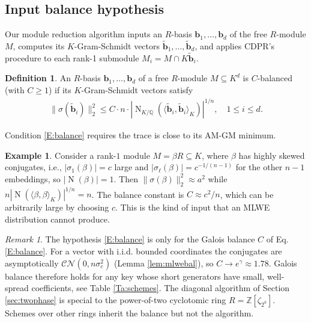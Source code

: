 \documentclass[11pt,a4paper]{article}
\theoremstyle{plain}
\theoremstyle{definition}
\newtheorem{definition}[theorem]{Definition}
\newtheorem{example}[theorem]{Example}
\theoremstyle{remark}
\newtheorem{remark}[theorem]{Remark}
\DeclareMathOperator{\Nm}{N}
\newcommand{\Z}{\mathbb{Z}}
\newcommand{\Q}{\mathbb{Q}}
\begin{document}
\subsection{Input balance hypothesis}

Our module reduction algorithm inputs an $R$-basis $\mathbf{b}_1, \dots, \mathbf{b}_d$ of the free $R$-module $M$, computes its $K$-Gram-Schmidt vectors $\tilde{\mathbf{b}}_1, \dots, \tilde{\mathbf{b}}_d$, and applies CDPR's procedure to each rank-1 submodule $M_i=M\cap K\tilde{\mathbf{b}}_i$. 

\begin{definition}\label{D:balanced}
  An $R$-basis $\mathbf{b}_1, \dots, \mathbf{b}_d$ of a free $R$-module $M\subseteq K^d$ is $C$-balanced (with $C\ge 1$) if its $K$-Gram-Schmidt vectors satisfy
  \begin{align}
  \|\sigma(\tilde{\mathbf{b}}_i)\|_2^2\le C\cdot n\cdot |\Nm_{K/\Q}(\langle\tilde{\mathbf{b}}_i, \tilde{\mathbf{b}}_i\rangle_K)|^{1/n}, \quad 1\le i\le d.
  \label{E:balance}
  \end{align}
\end{definition}

Condition \eqref{E:balance} requires the trace is close to its AM-GM minimum.

\begin{example}\label{ex:unbalanced}
Consider a rank-$1$ module $M=\beta R\subseteq K$, where $\beta$ has highly skewed conjugates, i.e., $|\sigma_1(\beta)|=c$ large and $|\sigma_\ell(\beta)|=c^{-1/(n-1)}$ for the other $n-1$ embeddings, so $|\Nm(\beta)|=1$. Then $\|\sigma(\beta)\|_2^2\approx a^2$ while $n|\Nm(\langle\beta,\beta\rangle_K)|^{1/n}=n$. The balance constant is $C\approx c^2/n$, which can be arbitrarily large by choosing $c$. This is the kind of input that an MLWE distribution cannot produce.
\end{example}

\begin{remark}
\label{rem:balanceschemes}
The hypothesis \eqref{E:balance} is only for the Galois balance $C$ of Eq.\eqref{E:balance}. For a vector with i.i.d. bounded coordinates the conjugates are asymptotically $\mathcal{CN}(0,n\sigma_c^2)$ (Lemma \ref{lem:mlwebal}), so $C\to e^{\gamma}\approx 1.78$. Galois balance therefore holds for any key whose short generators have small, well-spread coefficients, see Table \ref{Ta:schemes}. The diagonal algorithm of Section \ref{sec:twophase} is special to the power-of-two cyclotomic ring $R=\Z[\zeta_{2^k}]$. Schemes over other rings inherit the balance but not the algorithm. 
\end{remark}
\end{document}
